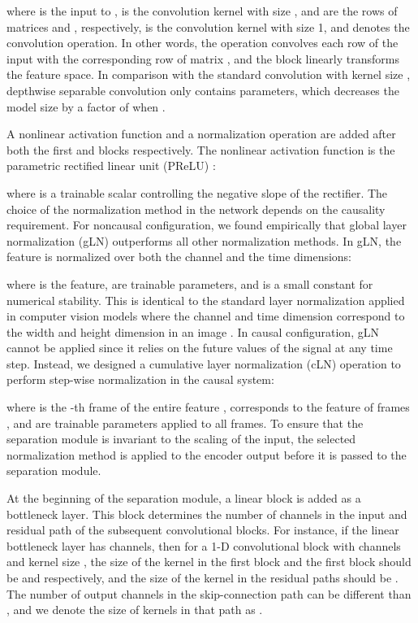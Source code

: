 \documentclass[journal]{IEEEtran}
\begin{document}
where  is the input to ,  is the convolution kernel with size ,  and  are the rows of matrices  and , respectively,  is the convolution kernel with size 1, and  denotes the convolution operation. In other words, the  operation convolves each row of the input  with the corresponding row of matrix , and the  block linearly transforms the feature space. In comparison with the standard convolution with kernel size , depthwise separable convolution only contains  parameters, which decreases the model size by a factor of  when . 

A nonlinear activation function and a normalization operation are added after both the first  and  blocks respectively. The nonlinear activation function is the parametric rectified linear unit (PReLU) \cite{he2015delving}:

where  is a trainable scalar controlling the negative slope of the rectifier. The choice of the normalization method in the network depends on the causality requirement. For noncausal configuration, we found empirically that global layer normalization (gLN) outperforms all other normalization methods. In gLN, the feature is normalized over both the channel and the time dimensions:

where  is the feature,  are trainable parameters, and  is a small constant for numerical stability. This is identical to the standard layer normalization applied in computer vision models where the channel and time dimension correspond to the width and height dimension in an image \cite{ba2016layer}. In causal configuration, gLN cannot be applied since it relies on the future values of the signal at any time step. Instead, we designed a cumulative layer normalization (cLN) operation to perform step-wise normalization in the causal system:

where  is the -th frame of the entire feature ,  corresponds to the feature of  frames , and  are trainable parameters applied to all frames. To ensure that the separation module is invariant to the scaling of the input, the selected normalization method is applied to the encoder output  before it is passed to the separation module.

At the beginning of the separation module, a linear  block is added as a bottleneck layer. This block determines the number of channels in the input and residual path of the subsequent convolutional blocks. For instance, if the linear bottleneck layer has  channels, then for a 1-D convolutional block with  channels and kernel size , the size of the kernel in the first  block and the first  block should be  and  respectively, and the size of the kernel in the residual paths should be . The number of output channels in the skip-connection path can be different than , and we denote the size of kernels in that path as . 
\end{document}
